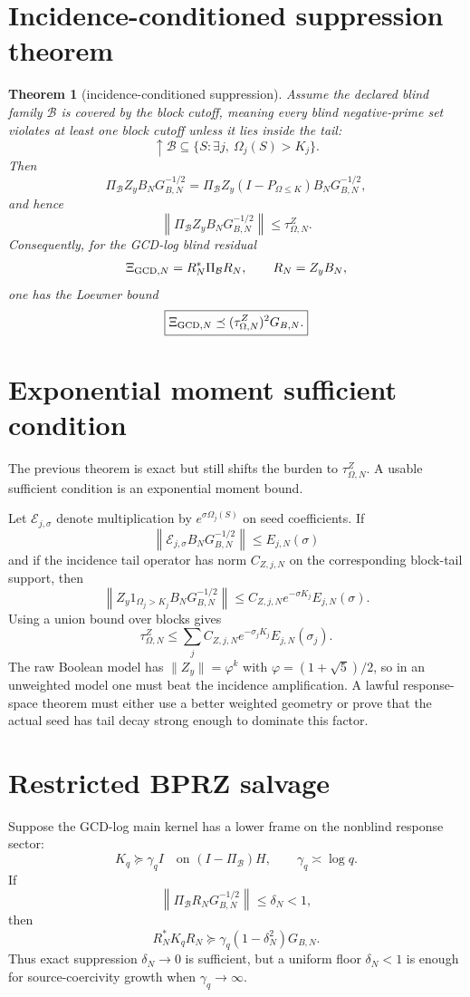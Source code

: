 \documentclass[11pt]{article}
\newtheorem{theorem}{Theorem}
\begin{document}
\section{Incidence-conditioned suppression theorem}
\begin{theorem}[incidence-conditioned suppression]
Assume the declared blind family $\mathcal B$ is covered by the block cutoff, meaning every blind negative-prime set violates at least one block cutoff unless it lies inside the tail:
\[
   \uparrow\mathcal B\subseteq\{S:\exists j,\ \Omega_j(S)>K_j\}.
\]
Then
\[
   \Pi_{\mathcal B}Z_yB_NG_{B,N}^{-1/2}
   =\Pi_{\mathcal B}Z_y(I-P_{\Omega\le K})B_NG_{B,N}^{-1/2},
\]
and hence
\[
   \boxed{
   \left\|\Pi_{\mathcal B}Z_yB_NG_{B,N}^{-1/2}\right\|
   \le \tau_{\Omega,N}^{Z}.
   }
\]
Consequently, for the GCD-log blind residual
\[
   \Xi_{{\rm GCD},N}=R_N^*\Pi_{\mathcal B}R_N,
   \qquad R_N=Z_yB_N,
\]
one has the Loewner bound
\[
   \boxed{
   \Xi_{{\rm GCD},N}\preceq (\tau_{\Omega,N}^{Z})^2 G_{B,N}.
   }
\]
\end{theorem}

\section{Exponential moment sufficient condition}
The previous theorem is exact but still shifts the burden to $\tau_{\Omega,N}^{Z}$.  A usable sufficient condition is an exponential moment bound.

Let $\mathcal E_{j,\sigma}$ denote multiplication by $e^{\sigma\Omega_j(S)}$ on seed coefficients.  If
\[
   \left\|\mathcal E_{j,\sigma}B_NG_{B,N}^{-1/2}\right\|\le E_{j,N}(\sigma)
\]
and if the incidence tail operator has norm $C_{Z,j,N}$ on the corresponding block-tail support, then
\[
   \left\|Z_y1_{\Omega_j>K_j}B_NG_{B,N}^{-1/2}\right\|
   \le
   C_{Z,j,N}e^{-\sigma K_j}E_{j,N}(\sigma).
\]
Using a union bound over blocks gives
\[
   \boxed{
   \tau_{\Omega,N}^{Z}
   \le
   \sum_j C_{Z,j,N}e^{-\sigma_jK_j}E_{j,N}(\sigma_j).
   }
\]
The raw Boolean model has $\|Z_y\|=\varphi^k$ with $\varphi=(1+\sqrt5)/2$, so in an unweighted model one must beat the incidence amplification.  A lawful response-space theorem must either use a better weighted geometry or prove that the actual seed has tail decay strong enough to dominate this factor.

\section{Restricted BPRZ salvage}
Suppose the GCD-log main kernel has a lower frame on the nonblind response sector:
\[
   K_q\succeq \gamma_q I\quad\text{on }(I-\Pi_{\mathcal B})H,
   \qquad \gamma_q\asymp \log q.
\]
If
\[
   \left\|\Pi_{\mathcal B}R_NG_{B,N}^{-1/2}\right\|
   \le \delta_N<1,
\]
then
\[
   \boxed{
   R_N^*K_qR_N\succeq \gamma_q(1-
   \delta_N^2)G_{B,N}.
   }
\]
Thus exact suppression $\delta_N\to0$ is sufficient, but a uniform floor $\delta_N<1$ is enough for source-coercivity growth when $\gamma_q\to\infty$.
\end{document}
